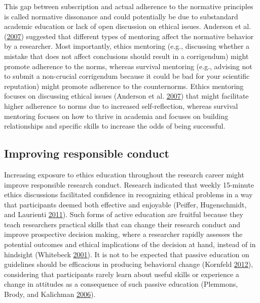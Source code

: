 \documentclass[a5paper]{book}
\begin{document}
This gap between subscription and actual adherence to the normative
principles is called normative dissonance and could potentially be due
to substandard academic education or lack of open discussion on ethical
issues. Anderson et al.
(\protect\hyperlink{ref-doi:10.1097ux2fACM.0b013e31812f764c}{2007})
suggested that different types of mentoring affect the normative
behavior by a researcher. Most importantly, ethics mentoring (e.g.,
discussing whether a mistake that does not affect conclusions should
result in a corrigendum) might promote adherence to the norms, whereas
survival mentoring (e.g., advising not to submit a non-crucial
corrigendum because it could be bad for your scientific reputation)
might promote adherence to the counternorms. Ethics mentoring focuses on
discussing ethical issues (Anderson et al.
\protect\hyperlink{ref-doi:10.1097ux2fACM.0b013e31812f764c}{2007}) that
might facilitate higher adherence to norms due to increased
self-reflection, whereas survival mentoring focuses on how to thrive in
academia and focuses on building relationships and specific skills to
increase the odds of being successful.

\hypertarget{improving-responsible-conduct}{\subsection{Improving
responsible conduct}\label{improving-responsible-conduct}}

Increasing exposure to ethics education throughout the research career
might improve responsible research conduct. Research indicated that
weekly 15-minute ethics discussions facilitated confidence in
recognizing ethical problems in a way that participants deemed both
effective and enjoyable (Peiffer, Hugenschmidt, and Laurienti
\protect\hyperlink{ref-doi:10.1007ux2fs11948-010-9197-3}{2011}). Such
forms of active education are fruitful because they teach researchers
practical skills that can change their research conduct and improve
prospective decision making, where a researcher rapidly assesses the
potential outcomes and ethical implications of the decision at hand,
instead of in hindsight (Whitebeck
\protect\hyperlink{ref-doi:10.1007ux2fs11948-001-0012-z}{2001}). It is
not to be expected that passive education on guidelines should be
efficacious in producing behavioral change (Kornfeld
\protect\hyperlink{ref-doi:10.1097ux2fACM.0b013e318257ee6a}{2012}),
considering that participants rarely learn about useful skills or
experience a change in attitudes as a consequence of such passive
education (Plemmons, Brody, and Kalichman
\protect\hyperlink{ref-doi:10.1007ux2fs11948-006-0055-2}{2006}).
\end{document}
